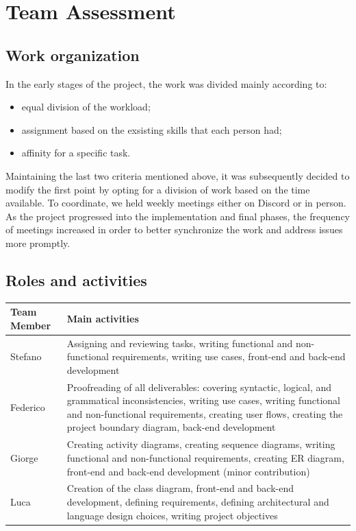 \section{Team Assessment}

\subsection{Work organization}

In the early stages of the project, the work was divided mainly according to:

\begin{itemize}
    \item equal division of the workload;
    \item assignment based on the exsisting skills that each person had;
    \item affinity for a specific task.
\end{itemize}

Maintaining the last two criteria mentioned above, it was subsequently decided to modify the first point by opting for a division of work based on the time available. To coordinate, we held weekly meetings either on Discord or in person. As the project progressed into the implementation and final phases, the frequency of meetings increased in order to better synchronize the work and address issues more promptly.

\subsection{Roles and activities}

\begin{table}[H]
\centering
\begin{tabular}{|p{2cm}|p{10cm}|}
\hline
\rowcolor{gray!50}
\textbf{Team Member} & \textbf{Main activities} \\
\hline
Stefano & Assigning and reviewing tasks, writing functional and non-functional requirements, writing use cases, front-end and back-end development \\
\hline
Federico & Proofreading of all deliverables: covering syntactic, logical, and grammatical inconsistencies, writing use cases, writing functional and non-functional requirements, creating user flows, creating the project boundary diagram, back-end development \\
\hline
Giorge & Creating activity diagrams, creating sequence diagrams, writing functional and non-functional requirements, creating ER diagram, front-end and back-end development (minor contribution) \\
\hline
Luca & Creation of the class diagram, front-end and back-end development, defining requirements, defining architectural and language design choices, writing project objectives \\
\hline
\end{tabular}
\end{table}

